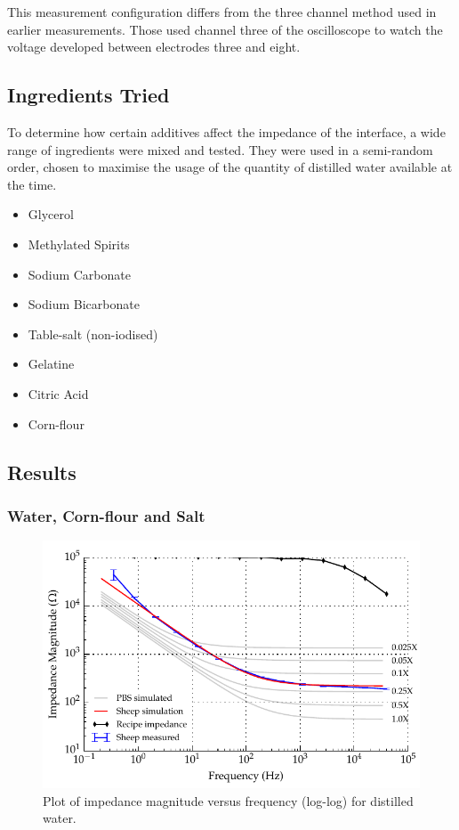 This measurement configuration differs from the three channel method used in earlier measurements.
Those used channel three of the oscilloscope to watch the voltage developed between electrodes three and eight.

\subsection{Ingredients Tried}
To determine how certain additives affect the impedance of the interface, a wide range of ingredients were mixed and tested.
They were used in a semi-random order, chosen to maximise the usage of the quantity of distilled water available at the time.
\begin{itemize}
    \item Glycerol
    \item Methylated Spirits
    \item Sodium Carbonate
    \item Sodium Bicarbonate
    \item Table-salt (non-iodised)
    \item Gelatine
    \item Citric Acid
    \item Corn-flour
\end{itemize}

\subsection{Results}

\subsubsection*{Water, Corn-flour and Salt}

\begin{figure}
    \centering
    \includegraphics[width=\textwidth]{content/pt2/graphics/run12_600ml-distilledWater_ZVsF_graph_mag}
    \caption{\label{fig:recipe_water_mag}Plot of impedance magnitude versus frequency (log-log) for distilled water.}
\end{figure}

